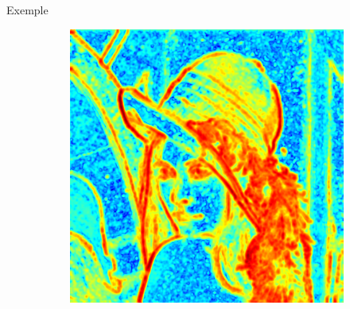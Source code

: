 \documentclass{beamer}
\begin{document}
\begin{frame}
\begin{exampleblock}{Exemple}
\begin{figure}[h]
\begin{subfigure}{0.3\textwidth}
                \includegraphics[width=\textwidth]{img/lena_distanceMap}
                \caption{}
            \end{subfigure}
        \end{figure}
    \end{exampleblock}
\end{frame}
\end{document}
